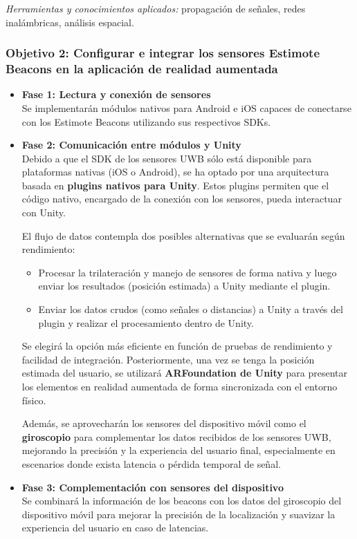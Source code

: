 \documentclass{article}
\begin{document}
\textit{Herramientas y conocimientos aplicados:} propagación de señales, redes inalámbricas, análisis espacial.

\subsubsection{Objetivo 2: Configurar e integrar los sensores Estimote Beacons en la aplicación de realidad aumentada}

\begin{itemize}
    \item \textbf{Fase 1: Lectura y conexión de sensores} \\
    Se implementarán módulos nativos para Android e iOS capaces de conectarse con los Estimote Beacons utilizando sus respectivos SDKs.

    \item \textbf{Fase 2: Comunicación entre módulos y Unity} \\
    Debido a que el SDK de los sensores UWB sólo está disponible para plataformas nativas (iOS o Android), se ha optado por una arquitectura basada en \textbf{plugins nativos para Unity}. Estos plugins permiten que el código nativo, encargado de la conexión con los sensores, pueda interactuar con Unity.

    El flujo de datos contempla dos posibles alternativas que se evaluarán según rendimiento:
    \begin{itemize}
        \item Procesar la trilateración y manejo de sensores de forma nativa y luego enviar los resultados (posición estimada) a Unity mediante el plugin.
        \item Enviar los datos crudos (como señales o distancias) a Unity a través del plugin y realizar el procesamiento dentro de Unity.
    \end{itemize}

    Se elegirá la opción más eficiente en función de pruebas de rendimiento y facilidad de integración. Posteriormente, una vez se tenga la posición estimada del usuario, se utilizará \textbf{ARFoundation de Unity} para presentar los elementos en realidad aumentada de forma sincronizada con el entorno físico.

    Además, se aprovecharán los sensores del dispositivo móvil como el \textbf{giroscopio} para complementar los datos recibidos de los sensores UWB, mejorando la precisión y la experiencia del usuario final, especialmente en escenarios donde exista latencia o pérdida temporal de señal.

    \item \textbf{Fase 3: Complementación con sensores del dispositivo} \\
    Se combinará la información de los beacons con los datos del giroscopio del dispositivo móvil para mejorar la precisión de la localización y suavizar la experiencia del usuario en caso de latencias.
\end{itemize}
\end{document}
